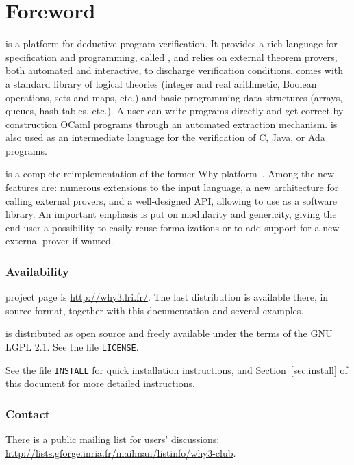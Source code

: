\documentclass[a4paper,11pt,twoside,openright]{memoir}
\begin{document}
\chapter*{Foreword}

\why is a platform for deductive program verification. It provides
a rich language for specification and programming, called \whyml, and
relies on external theorem provers, both automated and interactive,
to discharge verification conditions. \why comes with a standard
library of logical theories (integer and real arithmetic, Boolean
operations, sets and maps, etc.) and basic programming data structures
(arrays, queues, hash tables, etc.). A user can write \whyml programs
directly and get correct-by-construction OCaml programs through an
automated extraction mechanism. \whyml is also used as an intermediate
language for the verification of C, Java, or Ada programs.

\why is a complete reimplementation %
of the former Why platform~\cite{filliatre07cav}.
Among the new features are: numerous
extensions to the input language, a new architecture for calling
external provers, and a well-designed API, allowing to use \why as a
software library.  An important emphasis is put on modularity and
genericity, giving the end user a possibility to easily reuse \why
formalizations or to add support for a new external prover if wanted.

\subsection*{Availability}

\why project page is \url{http://why3.lri.fr/}.  The last distribution
is available there, in source format, together with this documentation
and several examples.

\why is distributed as open source and freely available under the
terms of the GNU LGPL 2.1. See the file \texttt{LICENSE}.

See the file \texttt{INSTALL} for quick installation instructions, and
Section~\ref{sec:install} of this document for more detailed
instructions.

\subsection*{Contact}

There is a public mailing list for users' discussions:
\url{http://lists.gforge.inria.fr/mailman/listinfo/why3-club}.
\end{document}
